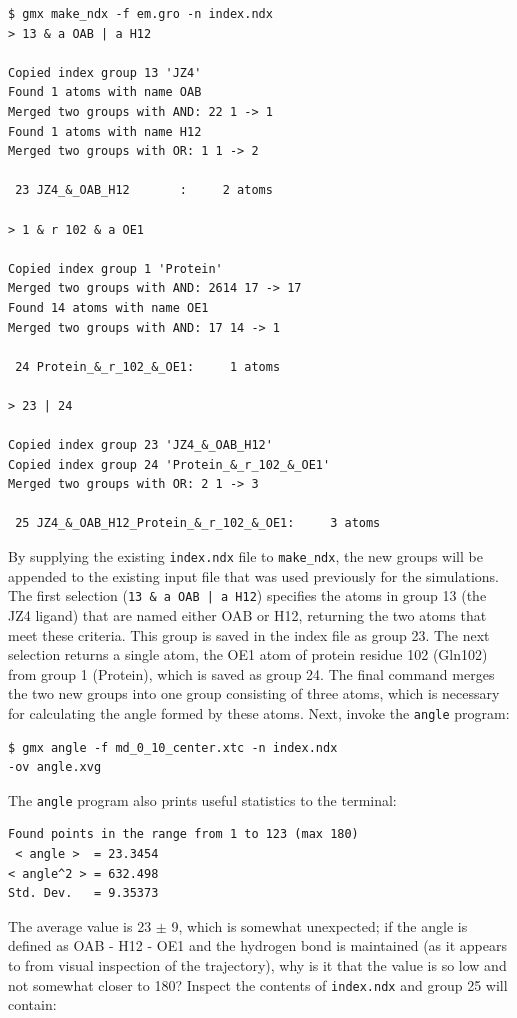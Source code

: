 \documentclass[9pt,tutorial]{livecoms}
\begin{document}
\begin{verbatim}
$ gmx make_ndx -f em.gro -n index.ndx
> 13 & a OAB | a H12

Copied index group 13 'JZ4'
Found 1 atoms with name OAB
Merged two groups with AND: 22 1 -> 1
Found 1 atoms with name H12
Merged two groups with OR: 1 1 -> 2

 23 JZ4_&_OAB_H12       :     2 atoms

> 1 & r 102 & a OE1

Copied index group 1 'Protein'
Merged two groups with AND: 2614 17 -> 17
Found 14 atoms with name OE1
Merged two groups with AND: 17 14 -> 1

 24 Protein_&_r_102_&_OE1:     1 atoms

> 23 | 24

Copied index group 23 'JZ4_&_OAB_H12'
Copied index group 24 'Protein_&_r_102_&_OE1'
Merged two groups with OR: 2 1 -> 3

 25 JZ4_&_OAB_H12_Protein_&_r_102_&_OE1:     3 atoms
\end{verbatim}

By supplying the existing \texttt{index.ndx} file to \texttt{make\_ndx}, the new groups will be appended to the existing input file that was used previously for the simulations. The first selection (\texttt{13 \& a OAB | a H12}) specifies the atoms in group 13 (the JZ4 ligand) that are named either OAB or H12, returning the two atoms that meet these criteria. This group is saved in the index file as group 23. The next selection returns a single atom, the OE1 atom of protein residue 102 (Gln102) from group 1 (Protein), which is saved as group 24. The final command merges the two new groups into one group consisting of three atoms, which is necessary for calculating the angle formed by these atoms. Next, invoke the \texttt{angle} program:

\begin{verbatim}
$ gmx angle -f md_0_10_center.xtc -n index.ndx
-ov angle.xvg  
\end{verbatim}

The \texttt{angle} program also prints useful statistics to the terminal:

\begin{verbatim}
Found points in the range from 1 to 123 (max 180)
 < angle >  = 23.3454
< angle^2 > = 632.498
Std. Dev.   = 9.35373
\end{verbatim}

The average value is 23 $\pm$ 9\textdegree, which is somewhat unexpected; if the angle is defined as OAB - H12 - OE1 and the hydrogen bond is maintained (as it appears to from visual inspection of the trajectory), why is it that the value is so low and not somewhat closer to 180\textdegree? Inspect the contents of \texttt{index.ndx} and group 25 will contain:
\end{document}

